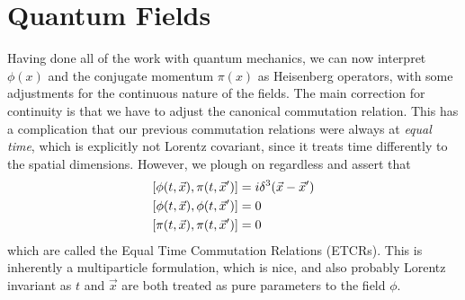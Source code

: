 \documentclass[notes.tex]{subfiles}
\begin{document}
\section{Quantum Fields}
Having done all of the work with quantum mechanics, we can now interpret $\phi(x)$ and the conjugate momentum $\pi(x)$ as Heisenberg operators, with some adjustments for the continuous nature of the fields. 
The main correction for continuity is that we have to adjust the canonical commutation relation. 
This has a complication that our previous commutation relations were always at \emph{equal time}, which is explicitly not Lorentz covariant, since it treats time differently to the spatial dimensions. However, we plough on regardless and assert that
\begin{align*}
    \commutator{\phi(t, \vec{x})}{\pi(t, \vec{x}^\prime)} &= i \delta^3(\vec{x} - \vec{x}^\prime)\\
    \commutator{\phi(t, \vec{x})}{\phi(t, \vec{x}^\prime)} &= 0\\
    \commutator{\pi(t, \vec{x})}{\pi(t, \vec{x}^\prime)} &= 0
\end{align*}
which are called the Equal Time Commutation Relations (ETCRs). 
This is inherently a multiparticle formulation, which is nice, and also probably Lorentz invariant as $t$ and $\vec{x}$ are both treated as pure parameters to the field $\phi$.
\end{document}
